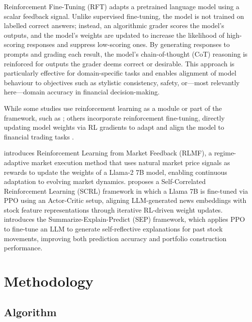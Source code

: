 \documentclass[conference]{IEEEtran}
\begin{document}
Reinforcement Fine-Tuning (RFT) adapts a pretrained language model using a scalar feedback
signal. Unlike supervised fine-tuning, the model is not trained on labelled correct answers;
instead, an algorithmic grader scores the model's outputs, and the model's weights are updated
to increase the likelihood of high-scoring responses and suppress low-scoring ones. By
generating responses to prompts and grading each result, the model's chain-of-thought (CoT)
reasoning is reinforced for outputs the grader deems correct or desirable. This approach is
particularly effective for domain-specific tasks \cite{openai2024rft} and enables
alignment of model behaviour to objectives such as stylistic consistency, safety, or---most
relevantly here---domain accuracy in financial decision-making.

While some studies use reinforcement learning as a module or part of the framework,
such as \cite{yu2023finmem, yu2024fincon, gu2024margin}; others incorporate reinforcement fine-tuning,
directly updating model weights via RL gradients to adapt and align the model to financial
trading tasks \cite{saqur2024, ding2023, koa2024explainable}.

\cite{saqur2024} introduces Reinforcement Learning from Market Feedback (RLMF),
a regime-adaptive market execution method that uses natural market price signals as rewards
to update the weights of a Llama-2 7B model, enabling continuous adaptation to evolving
market dynamics.
\cite{ding2023} proposes a Self-Correlated Reinforcement Learning (SCRL) framework in which
a Llama 7B is fine-tuned via PPO using an Actor-Critic setup, aligning LLM-generated
news embeddings with stock feature representations through iterative RL-driven weight updates.
\cite{koa2024explainable} introduces the Summarize-Explain-Predict (SEP) framework, which
applies PPO to fine-tune an LLM to generate self-reflective explanations for past stock
movements, improving both prediction accuracy and portfolio construction performance.

\section{Methodology}
\label{ch:method}

\subsection{Algorithm}
\label{sec:algorithm}
\end{document}
